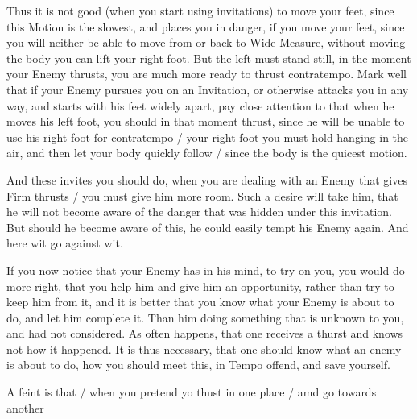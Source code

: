 Thus it is not good (when you start using invitations) to move your feet,
since this Motion is the slowest, and places you in danger, if you
move your feet, since you will neither be able to move from or back to
Wide Measure, without moving the body you can lift your right
foot. But the left must stand still, in the moment your Enemy thrusts,
you are much more ready to thrust contratempo. Mark well that if your
Enemy pursues you on an Invitation, or otherwise attacks you in any way, and
starts with his feet widely apart, pay close attention to that when he
moves his left foot, you should in that moment thrust, since he will
be unable to use his right foot for contratempo / your right foot you
must hold hanging in the air, and then let
your body quickly follow / since the body is the quicest motion.


And these invites you should do, when you are dealing with an Enemy
that gives Firm thrusts / you must give him more room. Such a desire
will take him, that he will not become aware of the danger that was
hidden under this invitation. But should he become aware of this, he could
easily tempt his Enemy again. And here wit go against wit.


If you now notice that your Enemy has in his mind, to try on you, you
would do more right, that you help him and give him an opportunity,
rather than try to keep him from it, and it is better that you know
what your Enemy is about to do, and let him complete it. Than him
doing something that is unknown to you, and had not considered. As
often happens, that one receives a thurst and knows not how it
happened. It is thus necessary, that one should know what an enemy is
about to do, how you should meet this, in Tempo offend, and save yourself.



A feint is that / when you pretend yo thust in one place / amd go
towards another
